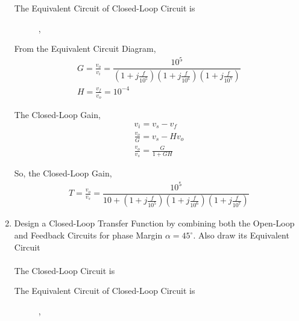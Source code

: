 \begin{enumerate}[label=\thesection.\arabic*.,ref=\thesection.\theenumi]
The Equivalent Circuit of Closed-Loop Circuit is
\begin{figure}[ht!]
	\begin{center}
		\resizebox{\columnwidth}{!}{}
	\end{center},
	\caption{}
	\label{fig:ee18btech11014_Closed-Loop Equivalent Circuit}
\end{figure}

From the Equivalent Circuit Diagram,
\begin{align}
G = \frac{v_{o}}{v_{i}} = \dfrac{10^5}{\left(1+j\frac{f}{10^{5}}\right)\left(1+j\frac{f}{10^{6}}\right)\left(1+j\frac{f}{10^{7}}\right)}\\
H = \frac{v_{f}}{v_{o}} = 10^{-4}
\end{align}

The Closed-Loop Gain,
\begin{align}
v_{i} = v_{s} - v_{f}\\
\frac{v_{o}}{G} = v_{s} - Hv_{o}\\
\frac{v_{o}}{v_{s}} = \frac{G}{1+GH}
\end{align}

So, the Closed-Loop Gain,
\begin{align}
T = \frac{v_{o}}{v_{s}} = \dfrac{10^5}{10 + \left(1+j\frac{f}{10^{5}}\right)\left(1+j\frac{f}{10^{6}}\right)\left(1+j\frac{f}{10^{7}}\right)}
\end{align}

\item  Design a Closed-Loop Transfer Function by combining both the Open-Loop and Feedback Circuits for phase Margin $\alpha=45^{\circ}$. Also draw its Equivalent Circuit\\
\solution\\
The Closed-Loop Circuit is
\begin{figure}[ht!]
	\begin{center}
		\resizebox{\columnwidth}{!}{}
	\end{center}
	\caption{}
	\label{fig:ee18btech11014_Closed-Loop Circuit}
\end{figure}

The Equivalent Circuit of Closed-Loop Circuit is
\begin{figure}[ht!]
	\begin{center}
		\resizebox{\columnwidth}{!}{}
	\end{center},
	\caption{}
	\label{fig:ee18btech11014_Closed-Loop Equivalent Circuit}
\end{figure}


\end{enumerate}
